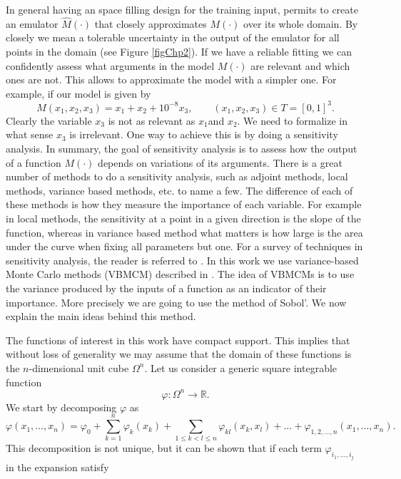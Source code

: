 \documentclass[12pt]{book}
\begin{document}
In general having an space filling design for the training input, permits to create an
emulator $\widehat{M}(\cdot)$ that closely approximates $M(\cdot)$  over its whole domain. 
By closely we mean a tolerable uncertainty in the output of the emulator 
for all points in the domain (see Figure \ref{figChp2}).
If we have a reliable fitting we can confidently assess what arguments in the model $M(\cdot)$
are relevant and which ones are not.
This allows to approximate  the model  with a simpler one.
For example, if our model is given by 
\begin{equation*}
M(x_{1},x_{2},x_{3})=x_{1}+x_{2}+10^{-8}x_{3},\qquad(x_{1},x_{2},x_{3})\in  T=[0,1]^{3}.
\end{equation*}
Clearly the variable $x_{3}$ is not as relevant as $x_{1}$and $x_{2}$. We need to
formalize in what sense $x_{3}$ is irrelevant. One way to achieve this is by doing a 
sensitivity analysis. In summary, the goal of 
sensitivity analysis is to assess how
the output of a function $M(\cdot)$ depends on variations of its arguments. There is
a great number of methods to do a sensitivity analysis, such as adjoint methods, local
methods, variance based methods, etc. to name a few. The difference of each of these
methods is how they measure the importance of each variable. For example in local methods,
the sensitivity at a point in a given direction is the slope of the function, whereas in
variance based method what matters is how large is the area under the curve when
fixing all parameters but one.
For a survey of techniques in sensitivity analysis, 
the reader is referred to \cite{saltelli2000sensitivity}. In this work we  use 
variance-based Monte Carlo methods (VBMCM) described in \cite{sobol1993sensitivity}.
The idea of  VBMCMs is to use the variance produced by  the inputs of a function as an indicator of 
their importance. More precisely we are going to use the method of Sobol'. We now explain
the main ideas behind this method.


The functions of interest in this work have compact support. This implies that
without loss of generality we may assume that  the domain of these functions 
is the $n$-dimensional unit cube $\Omega^{n}$. Let us consider a generic
square integrable function
\begin{equation*}
\varphi:\Omega^{n}\rightarrow\mathbb{R}.
\end{equation*}
We start by decomposing $\varphi$ as 
\begin{equation*}
\varphi(x_{1},\ldots,x_{n})=\varphi_{0}+\sum_{k=1}^{n}\varphi_{k}(x_{k})+
\sum_{1\leq k< l\leq n}\varphi_{kl}(x_{k},x_{l})+\ldots+
\varphi_{1,2,\ldots,n}(x_{1},\ldots,x_{n}).
\end{equation*}
This decomposition is not unique, but it can be shown that if each term $\varphi_{i_{1},\ldots,i_{j}}$
in the expansion satisfy
\end{document}
